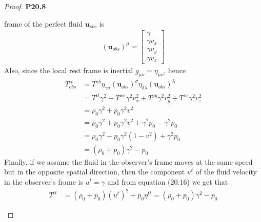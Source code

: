 \documentclass[11pt]{article}
\theoremstyle{definition}
\begin{document}
\begin{proof}{\textbf{P20.8}}
\begin{itemize}
frame of the perfect fluid $\bm{u}_{obs}$ is
\begin{align*}
    (\bm{u}_{obs})^\mu = \begin{bmatrix}
        \gamma \\ \gamma v_x \\ \gamma v_y \\ \gamma v_z
    \end{bmatrix}
\end{align*}
Also, since the local rest frame is inertial $g_{\mu\nu} = \eta_{\mu\nu}$,
hence
\begin{align*}
    T^{tt}_{obs}
    &= T^{\gamma\delta}
    \eta_{\gamma\sigma} (\bm{u}_{obs})^\sigma
    \eta_{\delta\lambda} (\bm{u}_{obs})^\lambda\\
    &= T^{tt}\gamma^2 + T^{xx}\gamma^2 v_x^2 + T^{yy}\gamma^2 v_y^2
    + T^{zz}\gamma^2 v_z^2\\
    &= \rho_0\gamma^2 + p_0\gamma^2v^2\\
    &= \rho_0\gamma^2 + p_0\gamma^2v^2 + \gamma^2p_0 - \gamma^2p_0\\
    &= \rho_0\gamma^2 - p_0\gamma^2(1 - v^2) + \gamma^2p_0\\
    &= (\rho_0 + p_0)\gamma^2 - p_0
\end{align*}
Finally, if we assume the fluid in the observer's frame moves at the same speed
but in the opposite spatial direction, then the component $u^t$ of the fluid
velocity in the observer's frame is $u^t = \gamma$ and
from equation (20.16) we get that
\begin{align*}
    T^{tt} &= (\rho_0 + p_0)(u^t)^2 + p_0\eta^{tt}
    = (\rho_0 + p_0)\gamma^2 - p_0
\end{align*}
\end{itemize}
\end{proof}
\end{document}
